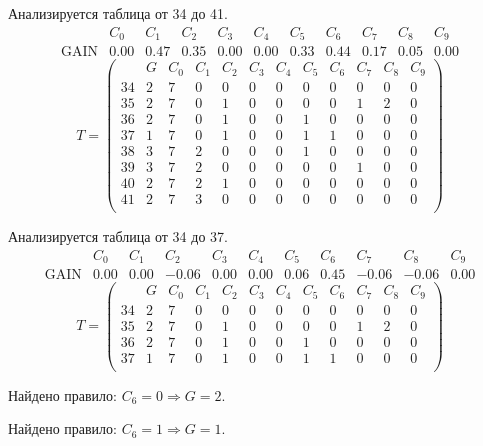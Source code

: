 Анализируется таблица от 34 до 41.
$$ 
\begin{array}{lc|c|cccccccc}
	  & C_{0} & C_{1} & C_{2} & C_{3} & C_{4} & C_{5} & C_{6} & C_{7} & C_{8} & C_{9}\\
 \textrm{GAIN} & 0.00 & 0.47 & 0.35 & 0.00 & 0.00 & 0.33 & 0.44 & 0.17 & 0.05 & 0.00
\end{array}
 $$
$$
T = \left( \begin{array}{lcc|c|cccccccc}
	 & G & C_{0} & C_{1} & C_{2} & C_{3} & C_{4} & C_{5} & C_{6} & C_{7} & C_{8} & C_{9}\\
	34 & 2 & 7 & 0 & 0 & 0 & 0 & 0 & 0 & 0 & 0 & 0\\
	35 & 2 & 7 & 0 & 1 & 0 & 0 & 0 & 0 & 1 & 2 & 0\\
	36 & 2 & 7 & 0 & 1 & 0 & 0 & 1 & 0 & 0 & 0 & 0\\
	37 & 1 & 7 & 0 & 1 & 0 & 0 & 1 & 1 & 0 & 0 & 0\\
	38 & 3 & 7 & 2 & 0 & 0 & 0 & 1 & 0 & 0 & 0 & 0\\
	39 & 3 & 7 & 2 & 0 & 0 & 0 & 0 & 0 & 1 & 0 & 0\\
	40 & 2 & 7 & 2 & 1 & 0 & 0 & 0 & 0 & 0 & 0 & 0\\
	41 & 2 & 7 & 3 & 0 & 0 & 0 & 0 & 0 & 0 & 0 & 0\\
\end{array} \right)
$$

Анализируется таблица от 34 до 37.
$$ 
\begin{array}{lcccccc|c|ccc}
	  & C_{0} & C_{1} & C_{2} & C_{3} & C_{4} & C_{5} & C_{6} & C_{7} & C_{8} & C_{9}\\
 \textrm{GAIN} & 0.00 & 0.00 & -0.06 & 0.00 & 0.00 & 0.06 & 0.45 & -0.06 & -0.06 & 0.00
\end{array}
 $$
$$
T = \left( \begin{array}{lccccccc|c|ccc}
	 & G & C_{0} & C_{1} & C_{2} & C_{3} & C_{4} & C_{5} & C_{6} & C_{7} & C_{8} & C_{9}\\
	34 & 2 & 7 & 0 & 0 & 0 & 0 & 0 & 0 & 0 & 0 & 0\\
	35 & 2 & 7 & 0 & 1 & 0 & 0 & 0 & 0 & 1 & 2 & 0\\
	36 & 2 & 7 & 0 & 1 & 0 & 0 & 1 & 0 & 0 & 0 & 0\\
	37 & 1 & 7 & 0 & 1 & 0 & 0 & 1 & 1 & 0 & 0 & 0\\
\end{array} \right)
$$

Найдено правило: $C_{6} = 0 \Longrightarrow G = 2$.

Найдено правило: $C_{6} = 1 \Longrightarrow G = 1$.

